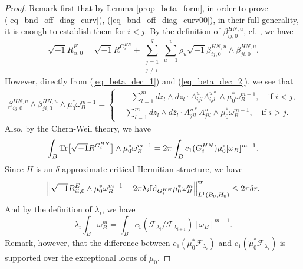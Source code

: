 \documentclass[12pt]{article}
\numberwithin{equation}{section}
\theoremstyle{theorem}
\theoremstyle{definition}
\theoremstyle{remark}
\newcommand{\imun} {\sqrt{-1}}
\newcommand{\tr}[1]{{\rm{Tr}} \big[ #1 \big]}
\begin{document}
	\begin{proof}
		Remark first that by Lemma \ref{prop_beta_form}, in order to prove (\ref{eq_bnd_off_diag_curv}), (\ref{eq_bnd_off_diag_curv00}), in their full generality, it is enough to establish them for $i < j$.
		By the definition of $\beta_{i j, 0}^{HN, u}$, cf. \cite[(V.14.6)]{DemCompl}, we have
		\begin{equation}\label{eq_bnd_off_diag_curv2}
			\imun R^E_{i i, 0} =  \imun R^{G_i^{HN}} + \sum_{\substack{j = 1 \\ j \neq i}}^{q} \sum_{u = 1}^{v} \rho_u \imun \beta_{i j, 0}^{HN, u} \wedge \beta_{j i, 0}^{HN, u}.
		\end{equation}
		However, directly from (\ref{eq_beta_dec_1}) and (\ref{eq_beta_dec_2}), we see that 
		\begin{multline}\label{eq_bnd_off_diag_curv3}
			 \beta_{i j, 0}^{HN, u} \wedge \beta_{j i, 0}^{HN, u} \wedge \mu_0^* \omega_B^{m - 1}
			 =
			 \begin{cases}
			 	 &
			 	 - \sum_{l = 1}^m dz_l \wedge d\overline{z}_l \cdot A_{i j l}^{u} A_{i j l}^{u *}  \wedge \mu_0^* \omega_B^{m - 1}, \quad \text{if } i < j,
				 \\
				 &
				 \sum_{l = 1}^m dz_l \wedge d\overline{z}_l \cdot A_{j i l}^{u *} A_{j i l}^{u} \wedge \mu_0^* \omega_B^{m - 1}, \quad \text{if } i > j.
			 \end{cases}
		\end{multline}
		Also, by the Chern-Weil theory, we have
		\begin{equation}\label{eq_bnd_off_diag_curv4}
			\int_B \tr{\imun R^{G_i^{HN}}} \wedge \mu_0^* \omega_B^{m - 1}
			=
			2 \pi
			\int_B c_1(G_i^{HN}) \mu_0^* [\omega_B]^{m - 1}.
		\end{equation}
		Since $H$ is an $\delta$-approximate critical Hermitian structure, we have
		\begin{equation}\label{eq_bnd_off_diag_curv5}
			\Big\| 
			\imun R^E_{i i, 0} \wedge \mu_0^* \omega_B^{m - 1}
			-
			2 \pi \lambda_i
			{\rm{Id}}_{G_i^{HN}}
		 	\mu_0^* \omega_B^m
		 	\Big\|_{L^1(B_0, H_0)}^{{\rm{tr}}}
			\leq 
			2 \pi \delta r.
		\end{equation}
		And by the definition of $\lambda_i$, we have
		\begin{equation}
			\lambda_i \int_B \omega_B^m
			=
			\int_B c_1(\mathcal{F}_{\lambda_i} / \mathcal{F}_{\lambda_{i + 1}}) [\omega_B]^{m - 1}.
		\end{equation}
		Remark, however, that the difference between $c_1(\mu_0^* \mathcal{F}_{\lambda_i})$ and $c_1(\tilde{\mu}_0^* \mathcal{F}_{\lambda_i})$ is supported over the exceptional locus of $\mu_0$.

\end{proof}
\end{document}
